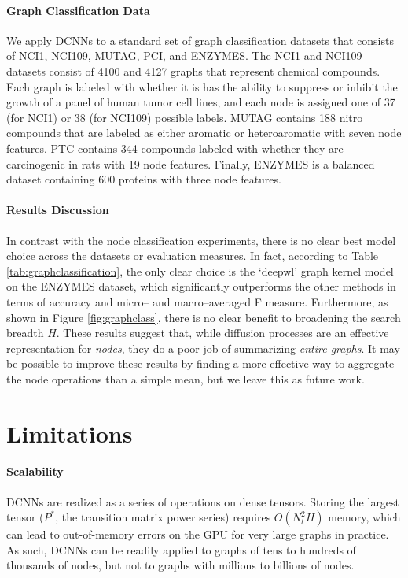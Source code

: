 \documentclass{article}
\begin{document}
\paragraph{Graph Classification Data} We apply DCNNs to a standard set of graph classification datasets that consists of NCI1, NCI109, MUTAG, PCI, and ENZYMES.  The NCI1 and NCI109 \cite{Wale:2007ec} datasets consist of 4100 and 4127 graphs that represent chemical compounds.  Each graph is labeled with whether it is has the ability to suppress or inhibit the growth of a panel of human tumor cell lines, and each node is assigned one of 37 (for NCI1) or 38 (for NCI109) possible labels. MUTAG \cite{debnath1991structure} contains 188 nitro compounds that are labeled as either aromatic or heteroaromatic with seven node features.  PTC \cite{toivonen2003statistical} contains 344 compounds labeled with whether they are carcinogenic in rats with 19 node features.  Finally, ENZYMES \cite{borgwardt2005protein} is a balanced dataset containing 600 proteins with three node features.

\paragraph{Results Discussion}
In contrast with the node classification experiments, there is no clear best model choice across the datasets or evaluation measures.  In fact, according to Table \ref{tab:graphclassification}, the only clear choice is the `deepwl' graph kernel model on the ENZYMES dataset, which significantly outperforms the other methods in terms of accuracy and micro-- and macro--averaged F measure.  Furthermore, as shown in Figure \ref{fig:graphclass}, there is no clear benefit to broadening the search breadth $H$.  These results suggest that, while diffusion processes are an effective representation for \emph{nodes}, they do a poor job of summarizing \emph{entire graphs}.  It may be possible to improve these results by finding a more effective way to aggregate the node operations than a simple mean, but we leave this as future work.


\section{Limitations}
\label{sec:limitations}
\paragraph{Scalability}  DCNNs are realized as a series of operations on dense tensors.  Storing the largest tensor ($P^*$, the transition matrix power series) requires $O(N_t^2 H)$ memory, which can lead to out-of-memory errors on the GPU for very large graphs in practice.  As such, DCNNs can be readily applied to graphs of tens to hundreds of thousands of nodes, but not to graphs with millions to billions of nodes.
\end{document}
